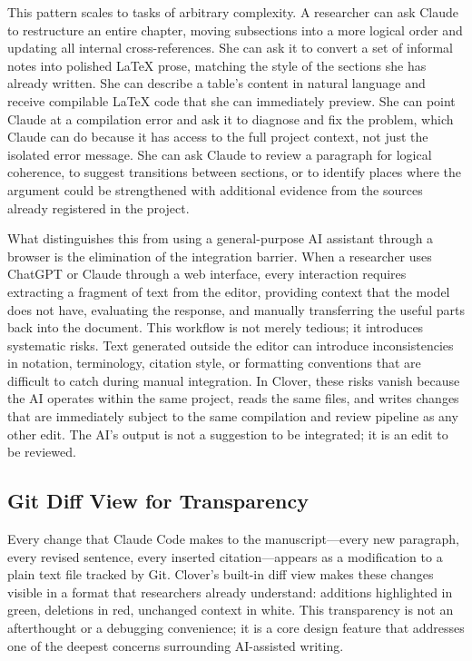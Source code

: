\documentclass[a4paper,11pt]{article}
\begin{document}
This pattern scales to tasks of arbitrary complexity. A researcher can ask Claude to restructure an entire chapter, moving subsections into a more logical order and updating all internal cross-references. She can ask it to convert a set of informal notes into polished \LaTeX{} prose, matching the style of the sections she has already written. She can describe a table's content in natural language and receive compilable \LaTeX{} code that she can immediately preview. She can point Claude at a compilation error and ask it to diagnose and fix the problem, which Claude can do because it has access to the full project context, not just the isolated error message. She can ask Claude to review a paragraph for logical coherence, to suggest transitions between sections, or to identify places where the argument could be strengthened with additional evidence from the sources already registered in the project.

What distinguishes this from using a general-purpose AI assistant through a browser is the elimination of the integration barrier. When a researcher uses ChatGPT or Claude through a web interface, every interaction requires extracting a fragment of text from the editor, providing context that the model does not have, evaluating the response, and manually transferring the useful parts back into the document. This workflow is not merely tedious; it introduces systematic risks. Text generated outside the editor can introduce inconsistencies in notation, terminology, citation style, or formatting conventions that are difficult to catch during manual integration. In Clover, these risks vanish because the AI operates within the same project, reads the same files, and writes changes that are immediately subject to the same compilation and review pipeline as any other edit. The AI's output is not a suggestion to be integrated; it is an edit to be reviewed.

\subsection{Git Diff View for Transparency}

Every change that Claude Code makes to the manuscript---every new paragraph, every revised sentence, every inserted citation---appears as a modification to a plain text file tracked by Git. Clover's built-in diff view makes these changes visible in a format that researchers already understand: additions highlighted in green, deletions in red, unchanged context in white. This transparency is not an afterthought or a debugging convenience; it is a core design feature that addresses one of the deepest concerns surrounding AI-assisted writing.
\end{document}

